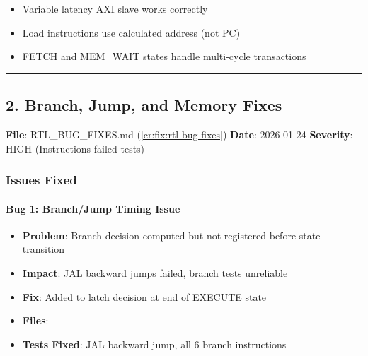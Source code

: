 \begin{record}

\begin{itemize}
\tightlist
\item
  \ok{} Variable latency AXI slave works correctly
\item
  \ok{} Load instructions use calculated address (not PC)
\item
  \ok{} FETCH and MEM\_WAIT states handle multi-cycle transactions
\end{itemize}

\begin{center}\rule{0.5\linewidth}{0.5pt}\end{center}

\end{record}

\subsection{2. Branch, Jump, and Memory Fixes}\label{cr:fix:fixes-index:2-branch-jump-and-memory-fixes}

\begin{record}

\textbf{File}:
RTL\_\allowbreak{}BUG\_\allowbreak{}FIXES.md (\cref{cr:fix:rtl-bug-fixes})
\textbf{Date}: 2026-01-24 \textbf{Severity}: \partialmark{} HIGH
(Instructions failed tests)

\end{record}

\subsubsection{Issues Fixed}\label{cr:fix:fixes-index:issues-fixed-1}

\paragraph{\texorpdfstring{Bug 1: Branch/\allowbreak{}Jump Timing
Issue}{Bug 1: Branch/Jump Timing Issue}}\label{cr:fix:fixes-index:bug-1-branchjump-timing-issue}

\begin{record}

\begin{itemize}
\tightlist
\item
  \textbf{Problem}: Branch decision computed but not registered before
  state transition
\item
  \textbf{Impact}: JAL backward jumps failed, branch tests unreliable
\item
  \textbf{Fix}: Added  to latch decision at
  end of EXECUTE state
\item
  \textbf{Files}: 
\item
  \textbf{Tests Fixed}: JAL backward jump, all 6 branch instructions
\end{itemize}

\end{record}

